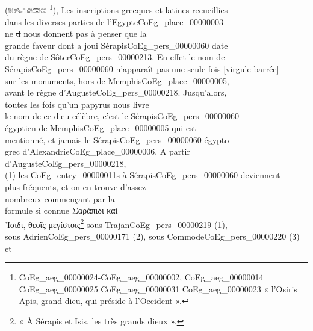 \documentclass{book}
\begin{document}
{\begin{paracol}{2}
\\
\\
\\
\\
 (\includegraphics[height=6pt]{CoEg_Mariette_hiero_1857-04-01_25.png} \footnote{\foreignlanguage{translit}{\gls{CoEg_aeg_00000024}-\gls{CoEg_aeg_00000002}, \gls{CoEg_aeg_00000014} \gls{CoEg_aeg_00000025} \gls{CoEg_aeg_00000031} \gls{CoEg_aeg_00000023}} « l'Osiris Apis, grand dieu, qui préside à l'Occident ».}),
\switchcolumn
\noindent Les inscriptions grecques et latines recueillies\\
dans les diverses parties de l’Egypte\gls{CoEg_place_00000003}\\
ne \sout{d} nous donnent pas à penser que la\\
grande faveur dont a joui Sérapis\gls{CoEg_pers_00000060} date\\
du règne de Sôter\gls{CoEg_pers_00000213}. En effet le nom de\\
Sérapis\gls{CoEg_pers_00000060} n’apparaît pas une seule fois [virgule barrée]\\
sur les monuments, hors de Memphis\gls{CoEg_place_00000005},\\
avant le règne d’Auguste\gls{CoEg_pers_00000218}. Jusqu’alors,\\
toutes les fois qu’un papyrus nous livre\\
le nom de ce dieu célèbre, c’est le Sérapis\gls{CoEg_pers_00000060}\\
égyptien de Memphis\gls{CoEg_place_00000005} qui est\\
mentionné, et jamais le Sérapis\gls{CoEg_pers_00000060} égypto-\\
grec d’Alexandrie\gls{CoEg_place_00000006}. A partir d’Auguste\gls{CoEg_pers_00000218},\\
(1) les \glspl{CoEg_entry_00000011} à Sérapis\gls{CoEg_pers_00000060} deviennent\\
plus fréquents, et on en trouve d’assez\\
nombreux commençant par la\\
formule si connue Σαράπιδι καὶ\\
Ἴσιδι, θεοῖς μεγίστοις\footnote{« À Sérapis et Isis, les très grands dieux ».} sous Trajan\gls{CoEg_pers_00000219} (1),\\
sous Adrien\gls{CoEg_pers_00000171} (2), sous Commode\gls{CoEg_pers_00000220} (3) et\\

\end{paracol}}
\end{document}

